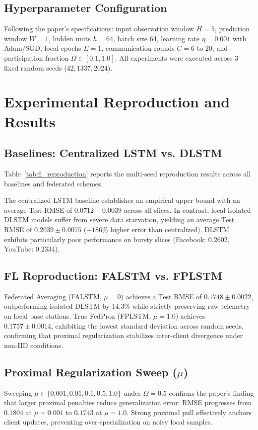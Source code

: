 \documentclass[10pt,journal,compsoc,twocolumn]{article}
\begin{document}
\subsection{Hyperparameter Configuration}
Following the paper's specifications: input observation window $H = 5$, prediction window $W = 1$, hidden units $h = 64$, batch size 64, learning rate $\eta = 0.001$ with Adam/SGD, local epochs $E = 1$, communication rounds $C = 6$ to $20$, and participation fraction $\Omega \in [0.1, 1.0]$. All experiments were executed across 3 fixed random seeds ($42, 1337, 2024$).

\section{Experimental Reproduction and Results}

\subsection{Baselines: Centralized LSTM vs. DLSTM}
Table~\ref{tab:fl_reproduction} reports the multi-seed reproduction results across all baselines and federated schemes.



The centralized LSTM baseline establishes an empirical upper bound with an average Test RMSE of $0.0712 \pm 0.0039$ across all slices. In contrast, local isolated DLSTM models suffer from severe data starvation, yielding an average Test RMSE of $0.2039 \pm 0.0075$ ($+186\%$ higher error than centralized). DLSTM exhibits particularly poor performance on bursty slices (Facebook: $0.2602$, YouTube: $0.2334$).

\subsection{FL Reproduction: FALSTM vs. FPLSTM}
Federated Averaging (FALSTM, $\mu=0$) achieves a Test RMSE of $0.1748 \pm 0.0022$, outperforming isolated DLSTM by 14.3\% while strictly preserving raw telemetry on local base stations. True FedProx (FPLSTM, $\mu=1.0$) achieves $0.1757 \pm 0.0014$, exhibiting the lowest standard deviation across random seeds, confirming that proximal regularization stabilizes inter-client divergence under non-IID conditions.

\subsection{Proximal Regularization Sweep ($\mu$)}
Sweeping $\mu \in \{0.001, 0.01, 0.1, 0.5, 1.0\}$ under $\Omega = 0.5$ confirms the paper's finding that larger proximal penalties reduce generalization error: RMSE progresses from $0.1804$ at $\mu=0.001$ to $0.1743$ at $\mu=1.0$. Strong proximal pull effectively anchors client updates, preventing over-specialization on noisy local samples.
\end{document}
